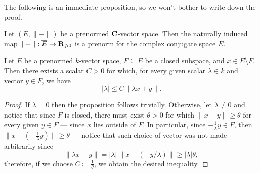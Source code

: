 The following is an immediate proposition, so we won't bother to write down
the proof.

\begin{lemma}
\label{lem:prenorm-complex-conjugate-space}
Let \((E, \| - \|)\) be a prenormed \(\mathbf{C}\)-vector space. Then the naturally
induced map \(\| - \|: \overline{E} \to \mathbf{R}_{\geqslant 0}\) is a prenorm for the
complex conjugate space \(\overline{E}\).
\end{lemma}

\begin{proposition}
Let \(E\) be a prenormed \(k\)-vector space, \(F \subseteq E\) be a closed
subspace, and \(x \in E \setminus F\). Then there exists a scalar \(C > 0\)
for which, for every given scalar \(\lambda \in k\) and vector \(y \in F\), we
have
\[
|\lambda| \leq C \| \lambda x + y \|.
\]
\end{proposition}

\begin{proof}
If \(\lambda = 0\) then the proposition follows trivially. Otherwise, let
\(\lambda \neq 0\) and notice that since \(F\) is closed, there must exist
\(\theta > 0\) for which \(\| x - y \| \geq \theta\) for every given \(y \in F\)
--- since \(x\) lies outside of \(F\). In particular, since \(-\frac{1}{\lambda}
y \in F\), then \(\| x - (-\frac{1}{\lambda} y) \| \geq \theta\) --- notice that
such choice of vector was not made arbitrarily since
\[
\| \lambda x + y \|
= |\lambda|\, \| x - (- y / \lambda) \| \geq |\lambda| \theta,
\]
therefore, if we choose \(C \coloneq \frac{1}{\theta}\), we obtain the desired
inequality.
\end{proof}

